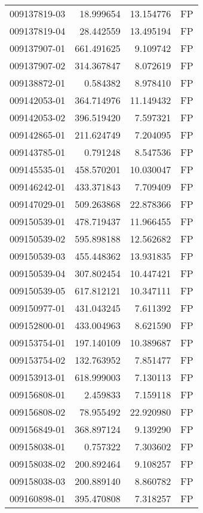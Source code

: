 \begin{tabular}{lrrl}
009137819-03 &   18.999654 &    13.154776 &   FP \\
009137819-04 &   28.442559 &    13.495194 &   FP \\
009137907-01 &  661.491625 &     9.109742 &   FP \\
009137907-02 &  314.367847 &     8.072619 &   FP \\
009138872-01 &    0.584382 &     8.978410 &   FP \\
009142053-01 &  364.714976 &    11.149432 &   FP \\
009142053-02 &  396.519420 &     7.597321 &   FP \\
009142865-01 &  211.624749 &     7.204095 &   FP \\
009143785-01 &    0.791248 &     8.547536 &   FP \\
009145535-01 &  458.570201 &    10.030047 &   FP \\
009146242-01 &  433.371843 &     7.709409 &   FP \\
009147029-01 &  509.263868 &    22.878366 &   FP \\
009150539-01 &  478.719437 &    11.966455 &   FP \\
009150539-02 &  595.898188 &    12.562682 &   FP \\
009150539-03 &  455.448362 &    13.931835 &   FP \\
009150539-04 &  307.802454 &    10.447421 &   FP \\
009150539-05 &  617.812121 &    10.347111 &   FP \\
009150977-01 &  431.043245 &     7.611392 &   FP \\
009152800-01 &  433.004963 &     8.621590 &   FP \\
009153754-01 &  197.140109 &    10.389687 &   FP \\
009153754-02 &  132.763952 &     7.851477 &   FP \\
009153913-01 &  618.999003 &     7.130113 &   FP \\
009156808-01 &    2.459833 &     7.159118 &   FP \\
009156808-02 &   78.955492 &    22.920980 &   FP \\
009156849-01 &  368.897124 &     9.139290 &   FP \\
009158038-01 &    0.757322 &     7.303602 &   FP \\
009158038-02 &  200.892464 &     9.108257 &   FP \\
009158038-03 &  200.889140 &     8.860782 &   FP \\
009160898-01 &  395.470808 &     7.318257 &   FP \\

\end{tabular}
